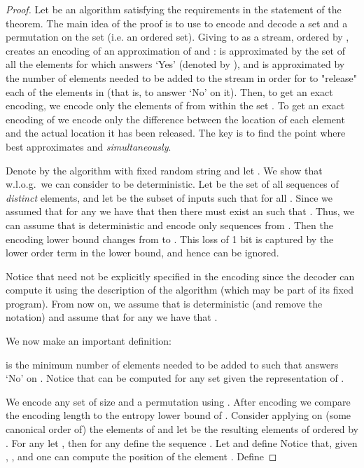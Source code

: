 \documentclass[11pt]{article}
\begin{document}
\begin{proof}
Let  be an algorithm satisfying the requirements in the statement of the theorem. The main idea of the proof is to use  to encode and decode a set  and a permutation  on the set (i.e. an ordered set). Giving  to  as a stream, ordered by , creates an encoding of an approximation of  and :  is approximated by the set of all the elements for which  answers `Yes' (denoted by ), and  is approximated by the number of elements needed to be added to the stream in order for  to "release" each of the elements in  (that is, to answer `No' on it). Then, to get an exact encoding, we encode only the elements of  from within the set . To get an exact encoding of  we encode only the difference between the location  of each element and the actual location it has been released. The key is to find the point where  best approximates  and  \emph{simultaneously}.

Denote by  the algorithm with fixed random string  and let . We show that w.l.o.g.\ we can consider  to be deterministic. Let  be the set of all sequences of  \emph{distinct} elements, and let  be the subset of inputs such that  for all . Since we assumed that for any  we have that  then there must exist an  such that . Thus, we can assume that  is deterministic and encode only sequences from . Then the encoding lower bound changes from  to . This loss of 1 bit is captured by the lower order term  in the lower bound, and hence can be ignored.

Notice that  need not be explicitly specified in the encoding since the decoder can compute it using the description of the algorithm  (which may be part of its fixed program). From now on, we assume that  is deterministic (and remove the  notation) and assume that for any  we have that .

We now make an important definition:

 is the minimum number of elements needed to be added to  such that  answers `No' on . Notice that  can be computed for any set  given the representation of .

We encode any set  of size  and a permutation  using . After encoding  we compare the encoding length to the entropy lower bound of . Consider applying  on (some canonical order of) the elements of  and let  be the resulting elements of  ordered by . For any  let , then for any  define the sequence . Let  and define 
Notice that, given , ,  and  one can compute the position  of the element . Define




\end{proof}
\end{document}
